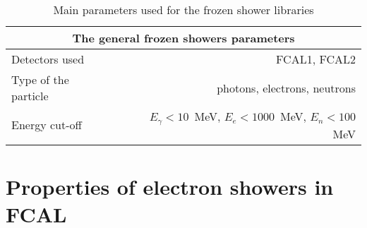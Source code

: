 \begin{figure}[!tbp]
\end{figure}

\begin{table}[!tbp]
\caption{Main parameters used for the frozen shower libraries}
\label{tab:MC_FS_params}
\centering
\begin{tabular}{l|r}
\hline
\hline
\multicolumn{2}{c}{The general frozen showers parameters} \\
\hline
Detectors used            & FCAL1, FCAL2\\
Type of the particle      & photons, electrons, neutrons \\
Energy cut-off            &  $E_{\gamma}<10$~MeV,  $E_{e}<1000$~MeV,  $E_n<100$~MeV \\
\hline
\end{tabular}
\end{table}

\section{Properties of electron showers in FCAL}\label{sec:FSproblem}





